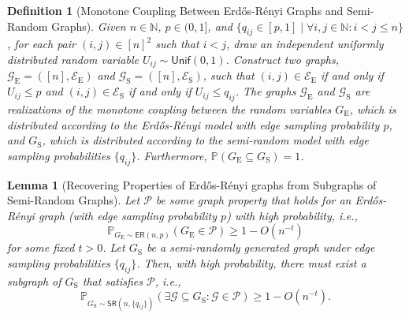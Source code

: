 \documentclass[10pt,a4paper]{amsart}
\newtheorem{definition}{Definition}
\newtheorem{lemma}{Lemma}
\begin{document}
\begin{definition}[Monotone Coupling Between Erd\H{o}s-R\'{e}nyi Graphs and Semi-Random Graphs]\label{def:maximal-coupling}
Given $n\in\mathbb{N}$, $p \in (0, 1]$, and $\{q_{ij} \in [p, 1] \mid \forall i,j\in\mathbb{N}: i<j\leq n\}$, for each pair $(i, j) \in [n]^2$ such that $i < j$, draw an independent uniformly distributed random variable $U_{ij} \sim \textsf{Unif}(0, 1)$. Construct two graphs, $\mathcal{G}_\text{E}=([n], \mathcal{E}_\text{E})$ and $\mathcal{G}_\text{S}=([n], \mathcal{E}_\text{S})$, such that $(i, j) \in \mathcal{E}_\text{E}$ if and only if $U_{ij} \leq p$ and $(i, j) \in \mathcal{E}_\text{S}$ if and only if $U_{ij} \leq q_{ij}$. The graphs $\mathcal{G}_\text{E}$ and $\mathcal{G}_\text{S}$ are realizations of the \emph{monotone coupling} between the random variables $G_\text{E}$, which is distributed according to the Erd\H{o}s-R\'{e}nyi model with edge sampling probability $p$, and $G_\text{S}$, which is distributed according to the semi-random model with edge sampling probabilities $\{q_{ij}\}$. Furthermore, $\mathbb{P}(G_\text{E} \subseteq G_\text{S})=1$. 
\end{definition}

\begin{lemma}[Recovering Properties of Erd\H{o}s-R\'{e}nyi graphs from Subgraphs of Semi-Random Graphs]\label{lem:recovering-properties-of-erdos-renyi-graphs}
Let $\mathcal{P}$ be some graph property that holds for an Erd\H{o}s-R\'{e}nyi graph (with edge sampling probability $p$) with high probability, i.e., 
\begin{equation}
\mathbb{P}_{G_\text{E} \sim \mathsf{ER}(n,p)}(G_\text{E} \in \mathcal{P}) \geq 1 - O(n^{-t})
\end{equation}
for some fixed $t>0$.
Let $G_\text{S}$ be a semi-randomly generated graph under edge sampling probabilities $\{q_{ij}\}$. Then, with high probability, there must exist a subgraph of $G_\text{S}$ that satisfies $\mathcal{P}$, i.e.,
\begin{equation}
\mathbb{P}_{G_\text{S} \sim \mathsf{SR}(n,\{q_{ij}\})}(\exists \mathcal{G} \subseteq G_\text{S}: \mathcal{G} \in \mathcal{P}) \geq 1 - O(n^{-t}).
\end{equation}
\end{lemma}
\end{document}
